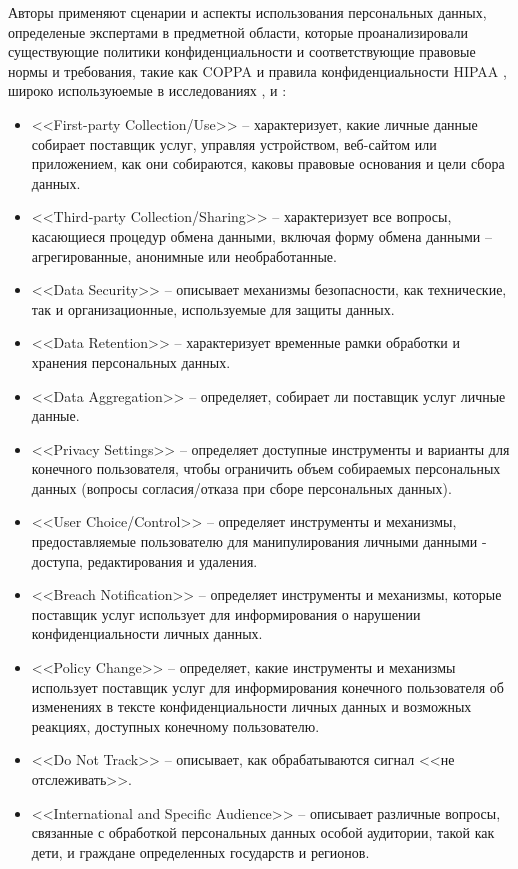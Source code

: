 \documentclass[../main]{subfiles}
\begin{document}
Авторы \cite{P2Onto} применяют сценарии и аспекты использования персональных данных, определеные экспертами в предметной области, которые проанализировали существующие политики конфиденциальности и соответствующие правовые нормы и требования, такие как COPPA \cite{MDPI2} и правила конфиденциальности HIPAA \cite{MDPI3}, широко используюемые в исследованиях \cite{MDPI6}, \cite{MDPI18} и \cite{MDPI8}:
\begin{itemize}
    \item <<First-party Collection/Use>> -- характеризует, какие личные данные собирает поставщик услуг, управляя устройством, веб-сайтом или приложением, как они собираются, каковы правовые основания и цели сбора данных.
    \item <<Third-party Collection/Sharing>> -- характеризует все вопросы, касающиеся процедур обмена данными, включая форму обмена данными -- агрегированные, анонимные или необработанные.
    \item <<Data Security>> -- описывает механизмы безопасности, как технические, так и организационные, используемые для защиты данных.
    \item <<Data Retention>> -- характеризует временные рамки обработки и хранения персональных данных.
    \item <<Data Aggregation>> -- определяет, собирает ли поставщик услуг личные данные.
    \item <<Privacy Settings>> -- определяет доступные инструменты и варианты для конечного пользователя, чтобы ограничить объем собираемых персональных данных (вопросы согласия/отказа при сборе персональных данных).
    \item <<User Choice/Control>> -- определяет инструменты и механизмы, предоставляемые пользователю для манипулирования личными данными - доступа, редактирования и удаления.
    \item <<Breach Notification>> -- определяет инструменты и механизмы, которые поставщик услуг использует для информирования о нарушении конфиденциальности личных данных.
    \item <<Policy Change>> -- определяет, какие инструменты и механизмы использует поставщик услуг для информирования конечного пользователя об изменениях в тексте конфиденциальности личных данных и возможных реакциях, доступных конечному пользователю.
    \item <<Do Not Track>> -- описывает, как обрабатываются сигнал <<не отслеживать>>.
    \item <<International and Specific Audience>> -- описывает различные вопросы, связанные с обработкой персональных данных особой аудитории, такой как дети, и граждане определенных государств и регионов.
\end{itemize}
\end{document}
